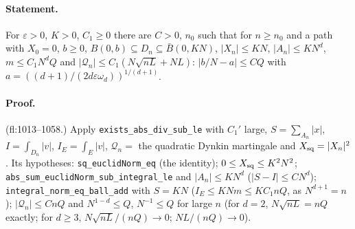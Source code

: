 \paragraph{Statement.} For $\varepsilon>0$, $K>0$, $C_1\geq0$ there are $C>0$, $n_0$ such that for $n\geq n_0$ and a path with $X_0=0$, $b\geq0$,
$B(0,b)\subseteq D_n\subseteq\bar B(0,KN)$, $|X_n|\leq KN$, $|A_n|\leq KN^d$, $m\leq C_1N^dQ$ and $|\mathcal Q_n|\leq C_1(N\sqrt{nL}+NL)$:
$|b/N-a|\leq CQ$ with $a=((d+1)/(2d\varepsilon\omega_d))^{1/(d+1)}$.
\paragraph{Proof.} (fl:1013--1058.) Apply \texttt{exists\_abs\_div\_sub\_le} with $C_1'$ large, $S=\sum_{A_n}|x|$, $I=\int_{D_n}|v|$, $I_E=\int_{E}|v|$,
$\mathcal Q_n=$ the quadratic Dynkin martingale and $X_{\rm sq}=|X_n|^2$. Its hypotheses: \texttt{sq\_euclidNorm\_eq} (the identity);
$0\leq X_{\rm sq}\leq K^2N^2$; \texttt{abs\_sum\_euclidNorm\_sub\_integral\_le} and $|A_n|\leq KN^d$ ($|S-I|\leq C N^d$);
\texttt{integral\_norm\_eq\_ball\_add} with $S=KN$ ($I_E\leq KNm\leq KC_1nQ$, as $N^{d+1}=n$); $|\mathcal Q_n|\leq C nQ$ and $N^{1-d}\leq Q$, $N^{-1}\leq Q$ for large $n$
(for $d=2$, $N\sqrt{nL}=nQ$ exactly; for $d\geq3$, $N\sqrt{nL}/(nQ)\to0$; $NL/(nQ)\to0$).
